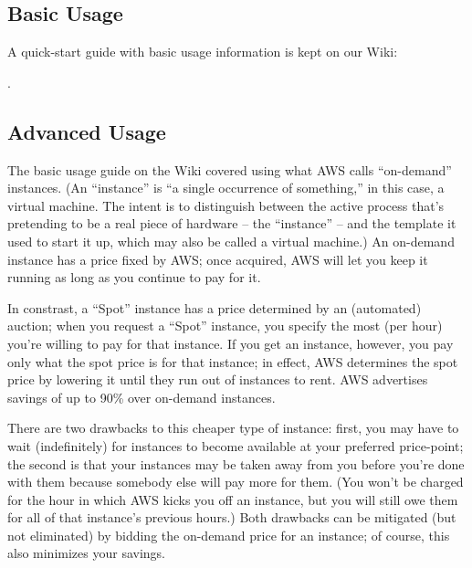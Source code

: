 \subsection{Basic Usage}

A quick-start guide with basic usage information is kept on our Wiki:


.

\subsection{Advanced Usage}

The basic usage guide on the Wiki covered using what AWS calls ``on-demand''
instances.  (An ``instance'' is ``a single occurrence of something,'' in
this case, a virtual machine.  The intent is to distinguish between the
active process that's pretending to be a real piece of hardware --
the ``instance'' -- and the template it used to start it up, which may also
be called a virtual machine.)  An on-demand instance has a price fixed by AWS;
once acquired, AWS will let you keep it running as long as you continue to
pay for it.

In constrast, a ``Spot'' instance has a price determined by an (automated)
auction; when you request a ``Spot'' instance, you specify the most (per hour)
you're willing to pay for that instance.  If you get an instance, however,
you pay only what the spot price is for that instance; in effect, AWS
determines the spot price by lowering it until they run out of instances
to rent.  AWS advertises savings of up to 90\% over on-demand instances.

There are two drawbacks to this cheaper type of instance: first,
you may have to wait (indefinitely) for instances to become available at
your preferred price-point; the second is that your instances may be taken
away from you before you're done with them because somebody else will pay
more for them.  (You won't be charged for the hour in which AWS kicks
you off an instance, but you will still owe them for all of that instance's
previous hours.)  Both drawbacks can be mitigated (but not eliminated) by
bidding the on-demand price for an instance; of course, this also minimizes
your savings.


